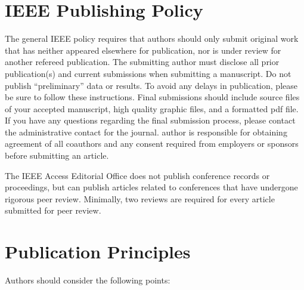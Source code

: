 \documentclass{ieeeaccess}
\begin{document}
\section{\break IEEE Publishing Policy}
The general IEEE policy requires that authors should only submit original
work that has neither appeared elsewhere for publication, nor is under
review for another refereed publication. The submitting author must disclose
all prior publication(s) and current submissions when submitting a
manuscript. Do not publish ``preliminary'' data or results. To avoid any delays in
publication, please be sure to follow these instructions.  Final
submissions should include source files of your accepted manuscript, high
quality graphic files, and a formatted pdf file. If you have any questions
regarding the final submission process, please contact the administrative
contact for the journal.
author is responsible for obtaining agreement of all coauthors and any
consent required from employers or sponsors before submitting an article.

The IEEE Access Editorial Office does not publish conference
records or proceedings, but can publish articles related to conferences that
have undergone rigorous peer review. Minimally, two reviews are required for
every article submitted for peer review.

\section{\break Publication Principles}
Authors should consider the following points:
\end{document}
